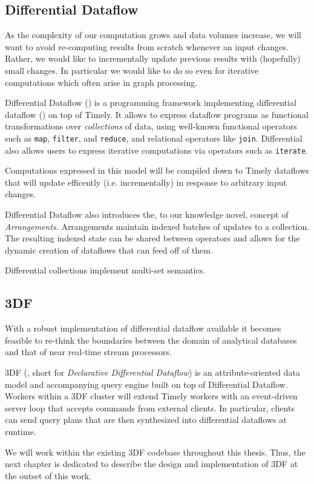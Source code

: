 \documentclass[../index.tex]{subfiles}
\begin{document}
\subsection{Differential Dataflow} \label{background-differential}

As the complexity of our computation grows and data volumes increase,
we will want to avoid re-computing results from scratch whenever an
input changes. Rather, we would like to incrementally update previous
results with (hopefully) small changes. In particular we would like to
do so even for iterative computations which often arise in graph
processing.

Differential Dataflow (\cite{differential}) is a programming framework
implementing differential dataflow (\cite{mcsherry2013differential})
on top of Timely. It allows to express dataflow programs as functional
transformations over \emph{collections} of data, using well-known
functional operators such as \texttt{map}, \texttt{filter}, and
\texttt{reduce}, and relational operators like
\texttt{join}. Differential also allows users to express iterative
computations via operators such as \texttt{iterate}.

Computations expressed in this model will be compiled down to Timely
dataflows that will update efficently (i.e. incrementally) in response
to arbitrary input changes.

Differential Dataflow also introduces the, to our knowledge novel,
concept of \emph{Arrangements}. Arrangements maintain indexed batches
of updates to a collection. The resulting indexed state can be shared
between operators and allows for the dynamic creation of dataflows
that can feed off of them.

Differential collections implement multi-set semantics.

\subsection{3DF}

With a robust implementation of differential dataflow available it
becomes feasible to re-think the boundaries between the domain of
analytical databases and that of near real-time stream processors.

3DF (\cite{declarative}, short for \emph{Declarative Differential
  Dataflow}) is an attribute-oriented data model and accompanying
query engine built on top of Differential Dataflow. Workers within a
3DF cluster will extend Timely workers with an event-driven server
loop that accepts commands from external clients. In particular,
clients can send query plans that are then synthesized into
differential dataflows at runtime.

We will work within the existing 3DF codebase throughout this
thesis. Thus, the next chapter is dedicated to describe the design and
implementation of 3DF at the outset of this work.
\end{document}

